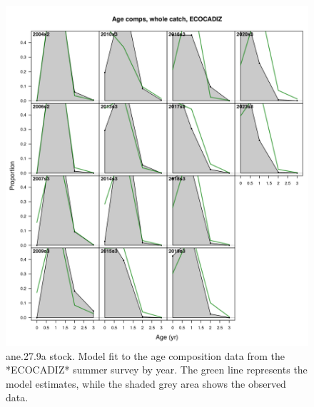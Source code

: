 \documentclass[
]{article}
\begin{document}
\begin{figure}[H]

{\centering \includegraphics[width=0.95\linewidth]{report/run/S1.0_4FLEETS/fig_age_fit_Ecocadiz} 

}

\caption{ane.27.9a stock. Model fit to the age composition data from the *ECOCADIZ* summer survey by year. The green line represents the model estimates, while the shaded grey area shows the observed data.}\label{fig:unnamed-chunk-24}
\end{figure}
\end{document}
